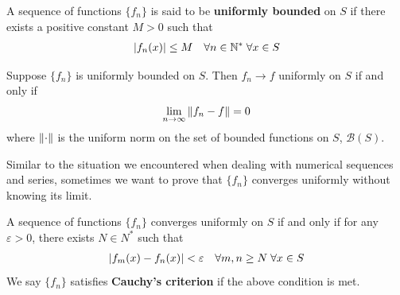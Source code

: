 \documentclass[thmcnt=section, 12pt]{my-elegantbook}
\begin{document}

A sequence of functions $\{f_n\}$ is said to be \textbf{uniformly bounded} on $S$ if there exists a positive constant $M > 0$ such that 
\begin{align*}
    \left\lvert f_n(x) \right\rvert \leq M
    \quad \forall n \in \mathbb{N}^\ast \; 
    \forall x \in S
\end{align*}


\begin{theorem}
    Suppose $\{f_n\}$ is uniformly bounded on $S$. Then $f_n \to f$ uniformly on $S$ if and only if
    \begin{align*}
        \lim_{n \to \infty} \left\lVert f_n - f \right\rVert = 0
    \end{align*}
    where $\left\lVert \cdot \right\rVert$ is the uniform norm on the set of bounded functions on $S$, $\mathcal{B}(S)$.
\end{theorem}



Similar to the situation we encountered when dealing with numerical sequences and series, sometimes we want to prove that $\{f_n\}$ converges uniformly without knowing its limit. 

\begin{theorem} \label{thm:42}
    A sequence of functions $\{f_n\}$ converges uniformly on $S$ if and only if for any $\varepsilon > 0$, there exists $N \in N^\ast$ such that 
    \begin{align*}
        \left\lvert f_m(x) - f_n(x) \right\rvert < \varepsilon
        \quad \forall m, n \geq N \;
        \forall x \in S
    \end{align*}
    We say $\{f_n\}$ satisfies \textbf{Cauchy's criterion} if the above condition is met.
\end{theorem}
\end{document}
